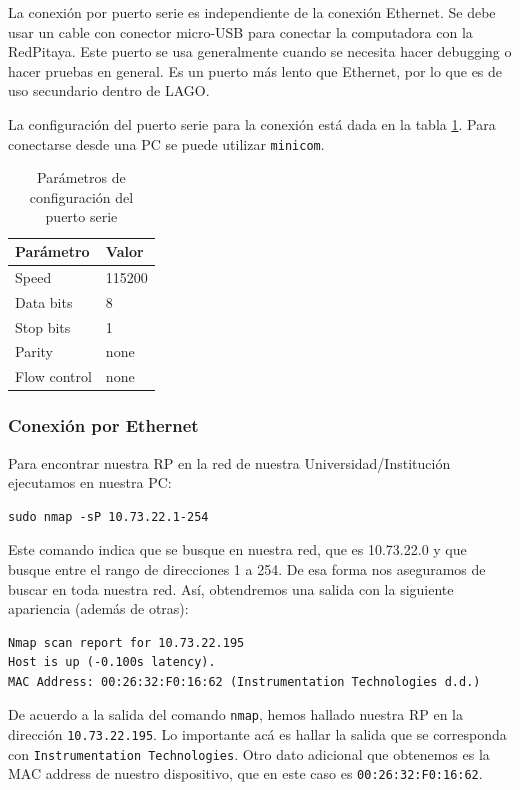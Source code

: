 \documentclass[a4paper,11pt]{article}
\begin{document}
La conexión por puerto serie es independiente de la conexión Ethernet. Se debe
usar un cable con conector micro-USB para conectar la computadora con la
RedPitaya. Este puerto se usa generalmente cuando se necesita hacer debugging o
hacer pruebas en general. Es un puerto más lento que Ethernet, por lo que es de
uso secundario dentro de LAGO. 

La configuración del puerto serie para la
conexión está dada en la tabla \ref{table:uart}. Para conectarse desde una PC se
puede utilizar \texttt{minicom}\cite{bibMinicom}.

\begin{table}[!t]
\renewcommand{\arraystretch}{1.3}
\caption{Parámetros de configuración del puerto serie}
\label{table:uart}
\centering
\begin{tabular}{|l|p{2.0cm}|}
\hline
\bf{Parámetro} & \bf{Valor}\\
\hline\hline
Speed        & 115200\\
Data bits    & 8\\
Stop bits    & 1\\
Parity       & none\\
Flow control & none\\
\hline
\end{tabular}
\end{table}

\subsubsection{Conexión por Ethernet}

Para encontrar nuestra RP en la red de nuestra Universidad/Institución
ejecutamos en nuestra PC:

\begin{verbatim}
sudo nmap -sP 10.73.22.1-254
\end{verbatim}

\noindent Este comando indica que se busque en nuestra red, que es 10.73.22.0 y que busque
entre el rango de direcciones 1 a 254. De esa forma nos aseguramos de buscar en
toda nuestra red. Así, obtendremos una salida con la siguiente apariencia
(además de otras):
 
\begin{verbatim}
Nmap scan report for 10.73.22.195
Host is up (-0.100s latency).
MAC Address: 00:26:32:F0:16:62 (Instrumentation Technologies d.d.)
\end{verbatim}

\noindent De acuerdo a la salida del comando \texttt{nmap}, hemos hallado nuestra RP en la
dirección \texttt{10.73.22.195}. Lo importante acá es hallar la salida que se
corresponda con \texttt{Instrumentation Technologies}. Otro dato adicional que
obtenemos es la MAC address de nuestro dispositivo, que en este caso es
\texttt{00:26:32:F0:16:62}. 
\end{document}

